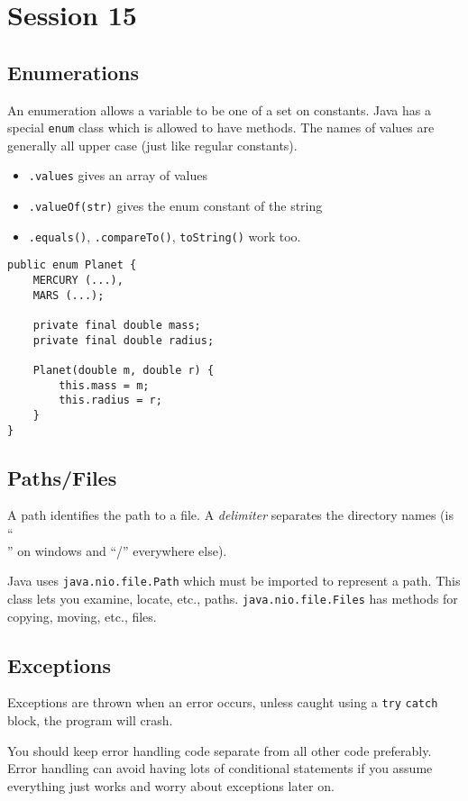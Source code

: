 \section{Session 15}\label{sec:session_15}

\subsection{Enumerations}\label{sub:enumerations}

An enumeration allows a variable to be one of a set on constants.
Java has a special \texttt{enum} class which is allowed to have methods.
The names of values are generally all upper case (just like regular constants).

\begin{itemize}
	\item \texttt{.values} gives an array of values
	\item \texttt{.valueOf(str)} gives the enum constant of the string
	\item \texttt{.equals()}, \texttt{.compareTo()}, \texttt{toString()} work too.
\end{itemize}

\begin{verbatim}
public enum Planet {
    MERCURY (...),
    MARS (...);

    private final double mass;
    private final double radius;

    Planet(double m, double r) {
        this.mass = m;
        this.radius = r;
    }
}
\end{verbatim}

\subsection{Paths/Files}\label{sub:paths_files}

A path identifies the path to a file.
A \emph{delimiter} separates the directory names (is ``\\'' on windows and ``/'' everywhere else).

Java uses \texttt{java.nio.file.Path} which must be imported to represent a path.
This class lets you examine, locate, etc., paths.
\texttt{java.nio.file.Files} has methods for copying, moving, etc., files.

\subsection{Exceptions}\label{sub:exceptions}

Exceptions are thrown when an error occurs, unless caught using a \texttt{try} \texttt{catch} block, the program will crash.

You should keep error handling code separate from all other code preferably.
Error handling can avoid having lots of conditional statements if you assume everything just works and worry about exceptions later on.

